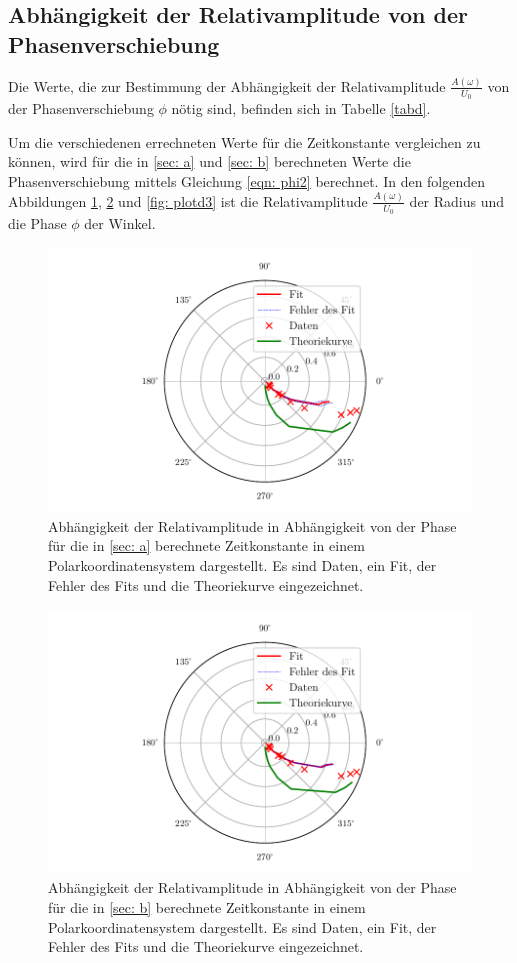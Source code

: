 \subsection{Abhängigkeit der Relativamplitude von der Phasenverschiebung}
Die Werte, die zur Bestimmung der Abhängigkeit der Relativamplitude $\frac{A(\omega)}{U_{0}}$ von der
Phasenverschiebung $\phi$ nötig sind, befinden sich in Tabelle \ref{tabd}.

Um die verschiedenen errechneten Werte für die Zeitkonstante vergleichen
zu können, wird für die in \ref{sec: a} und \ref{sec: b} berechneten Werte die Phasenverschiebung mittels
Gleichung \eqref{eqn: phi2} berechnet. In den folgenden Abbildungen \ref{fig: plotd1}, \ref{fig: plotd2} und
\ref{fig: plotd3} ist die Relativamplitude $\frac{A(\omega)}{U_{0}}$ der Radius und die Phase $\phi$ der Winkel.
\begin{figure}
  \centering
  \includegraphics[width=12cm, height=7cm]{build/plotd1.pdf}
  \caption{Abhängigkeit der Relativamplitude in Abhängigkeit von der Phase für die in \ref{sec: a} 
  berechnete Zeitkonstante in einem Polarkoordinatensystem dargestellt. Es sind Daten, ein Fit, der Fehler
  des Fits und die Theoriekurve eingezeichnet.}
  \label{fig: plotd1}
\end{figure}

\begin{figure}
  \centering
  \includegraphics[width=12cm, height=7cm]{build/plotd2.pdf}
  \caption{Abhängigkeit der Relativamplitude in Abhängigkeit von der Phase für die in \ref{sec: b} 
  berechnete Zeitkonstante in einem Polarkoordinatensystem dargestellt. Es sind Daten, ein Fit, der Fehler
  des Fits und die Theoriekurve eingezeichnet.}
  \label{fig: plotd2}
\end{figure}

